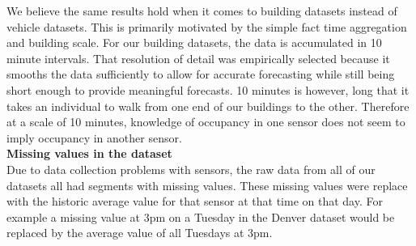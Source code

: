 We believe the same results hold when it comes to building datasets instead of vehicle datasets.  This is primarily motivated by the simple fact time aggregation and building scale.  For our building datasets, the data is accumulated in 10 minute intervals.  That resolution of detail was empirically selected because it smooths the data sufficiently to allow for accurate forecasting while still being short enough to provide meaningful forecasts.  10 minutes is however, long that it takes an individual to walk from one end of our buildings to the other.  Therefore at a scale of 10 minutes, knowledge of occupancy in one sensor does not seem to imply occupancy in another sensor. \\

\noindent
\textbf{Missing values in the dataset} \\
Due to data collection problems with sensors, the raw data from all of our datasets all had segments with missing values.  These missing values were replace with the historic average value for that sensor at that time on that day.  For example a missing value at 3pm on a Tuesday in the Denver dataset would be replaced by the average value of all Tuesdays at 3pm.




